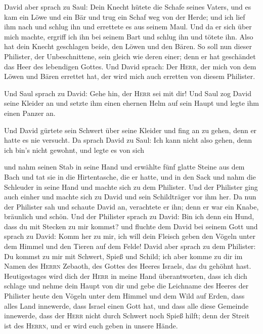  David aber sprach zu Saul: Dein Knecht hütete die Schafe
seines Vaters, und es kam ein Löwe und ein Bär und trug ein Schaf weg
von der Herde;  und ich lief ihm nach und schlug ihn und
errettete es aus seinem Maul. Und da er sich über mich machte, ergriff
ich ihn bei seinem Bart und schlug ihn und tötete ihn. 
Also hat dein Knecht geschlagen beide, den Löwen und den Bären. So soll
nun dieser Philister, der Unbeschnittene, sein gleich wie deren einer;
denn er hat geschändet das Heer des lebendigen Gottes. 
Und David sprach: Der \textsc{Herr}, der mich von dem Löwen und Bären
errettet hat, der wird mich auch erretten von diesem Philister.

 Und Saul sprach zu David: Gehe hin, der \textsc{Herr}
sei mit dir! Und Saul zog David seine Kleider an und setzte ihm einen
ehernen Helm auf sein Haupt und legte ihm einen Panzer an.

 Und David gürtete sein Schwert über seine Kleider und
fing an zu gehen, denn er hatte es nie versucht. Da sprach David zu
Saul: Ich kann nicht also gehen, denn ich bin's nicht gewohnt, und legte
es von sich

 und nahm seinen Stab in seine Hand und erwählte fünf
glatte Steine aus dem Bach und tat sie in die Hirtentasche, die er
hatte, und in den Sack und nahm die Schleuder in seine Hand und machte
sich zu dem Philister.  Und der Philister ging auch
einher und machte sich zu David und sein Schildträger vor ihm her.
 Da nun der Philister sah und schaute David an,
verachtete er ihn; denn er war ein Knabe, bräunlich und schön.
 Und der Philister sprach zu David: Bin ich denn ein
Hund, dass du mit Stecken zu mir kommst? und fluchte dem David bei
seinem Gott  und sprach zu David: Komm her zu mir, ich
will dein Fleisch geben den Vögeln unter dem Himmel und den Tieren auf
dem Felde!  David aber sprach zu dem Philister: Du kommst
zu mir mit Schwert, Spieß und Schild; ich aber komme zu dir im Namen des
\textsc{Herrn} Zebaoth, des Gottes des Heeres Israels, das du gehöhnt
hast.  Heutigestages wird dich der \textsc{Herr} in meine
Hand überantworten, dass ich dich schlage und nehme dein Haupt von dir
und gebe die Leichname des Heeres der Philister heute den Vögeln unter
dem Himmel und dem Wild auf Erden, dass alles Land innewerde, dass
Israel einen Gott hat,  und dass alle diese Gemeinde
innewerde, dass der \textsc{Herr} nicht durch Schwert noch Spieß hilft;
denn der Streit ist des \textsc{Herrn}, und er wird euch geben in unsere
Hände.

